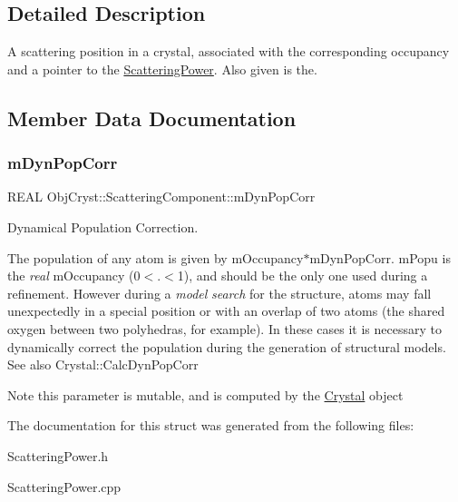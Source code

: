 \subsection{Detailed Description}
A scattering position in a crystal, associated with the corresponding occupancy and a pointer to the \mbox{\hyperlink{class_obj_cryst_1_1_scattering_power}{Scattering\+Power}}. Also given is the. 



\subsection{Member Data Documentation}
\mbox{\label{struct_obj_cryst_1_1_scattering_component_a33af12bb3f340af259a8b8450f837efd}} 
\subsubsection{\texorpdfstring{mDynPopCorr}{mDynPopCorr}}
{\footnotesize\ttfamily R\+E\+AL Obj\+Cryst\+::\+Scattering\+Component\+::m\+Dyn\+Pop\+Corr\hspace{0.3cm}{\ttfamily [mutable]}}

Dynamical Population Correction.

The population of any atom is given by m\+Occupancy$\ast$m\+Dyn\+Pop\+Corr. m\+Popu is the {\itshape real} m\+Occupancy (0$<$.$<$1), and should be the only one used during a refinement. However during a {\itshape model} {\itshape search} for the structure, atoms may fall unexpectedly in a special position or with an overlap of two atoms (the shared oxygen between two polyhedras, for example). In these cases it is necessary to dynamically correct the population during the generation of structural models. See also Crystal\+::\+Calc\+Dyn\+Pop\+Corr

\begin{DoxyNote}{Note}
this parameter is mutable, and is computed by the \mbox{\hyperlink{class_obj_cryst_1_1_crystal}{Crystal}} object 
\end{DoxyNote}


The documentation for this struct was generated from the following files\+:\begin{DoxyCompactItemize}
\item 
Scattering\+Power.\+h\item 
Scattering\+Power.\+cpp\end{DoxyCompactItemize}
